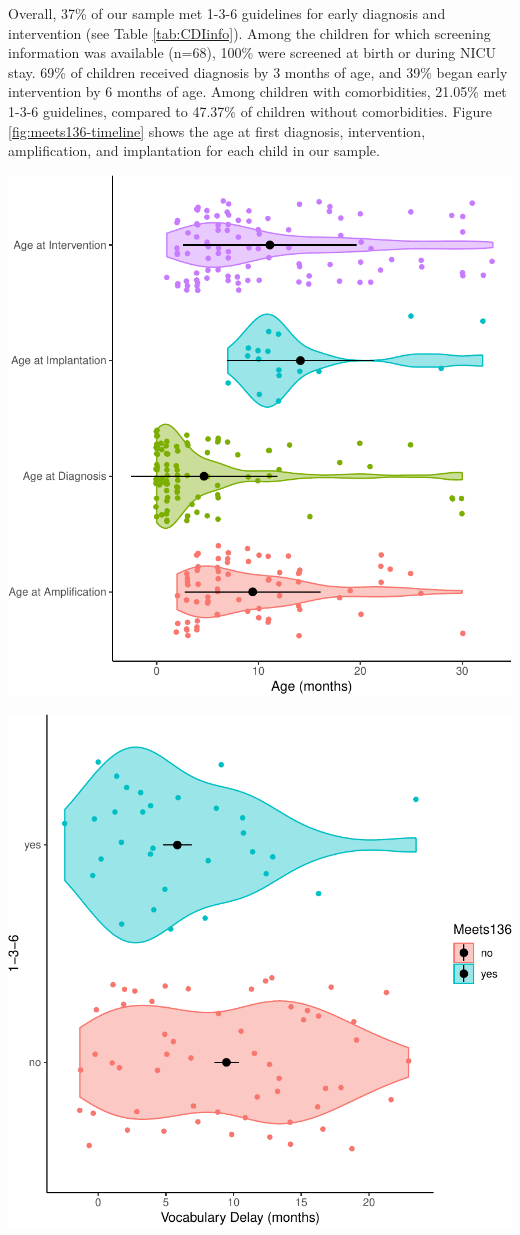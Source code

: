 \documentclass[english,man]{apa6}
\begin{document}
Overall, 37\% of our sample met 1-3-6 guidelines for early diagnosis and intervention (see Table \ref{tab:CDIinfo}). Among the children for which screening information was available (n=68), 100\% were screened at birth or during NICU stay. 69\% of children received diagnosis by 3 months of age, and 39\% began early intervention by 6 months of age. Among children with comorbidities, 21.05\% met 1-3-6 guidelines, compared to 47.37\% of children without comorbidities. Figure \ref{fig:meets136-timeline} shows the age at first diagnosis, intervention, amplification, and implantation for each child in our sample.

\includegraphics{ELSSP_paper_files/figure-latex/meets136-timeline-1.pdf}

\includegraphics{ELSSP_paper_files/figure-latex/delay-violins-1.pdf}
\end{document}
